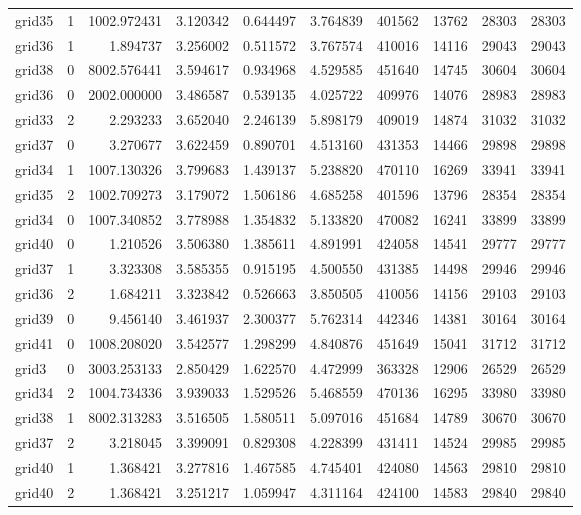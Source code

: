 \begin{longtable}{|l|r|r|r|r|r|r|r|r|r|}
grid35 & 1 & 1002.972431 & 3.120342 & 0.644497 & 3.764839 & 401562 & 13762 & 28303 & 28303 \\
grid36 & 1 & 1.894737 & 3.256002 & 0.511572 & 3.767574 & 410016 & 14116 & 29043 & 29043 \\
grid38 & 0 & 8002.576441 & 3.594617 & 0.934968 & 4.529585 & 451640 & 14745 & 30604 & 30604 \\
grid36 & 0 & 2002.000000 & 3.486587 & 0.539135 & 4.025722 & 409976 & 14076 & 28983 & 28983 \\
grid33 & 2 & 2.293233 & 3.652040 & 2.246139 & 5.898179 & 409019 & 14874 & 31032 & 31032 \\
grid37 & 0 & 3.270677 & 3.622459 & 0.890701 & 4.513160 & 431353 & 14466 & 29898 & 29898 \\
grid34 & 1 & 1007.130326 & 3.799683 & 1.439137 & 5.238820 & 470110 & 16269 & 33941 & 33941 \\
grid35 & 2 & 1002.709273 & 3.179072 & 1.506186 & 4.685258 & 401596 & 13796 & 28354 & 28354 \\
grid34 & 0 & 1007.340852 & 3.778988 & 1.354832 & 5.133820 & 470082 & 16241 & 33899 & 33899 \\
grid40 & 0 & 1.210526 & 3.506380 & 1.385611 & 4.891991 & 424058 & 14541 & 29777 & 29777 \\
grid37 & 1 & 3.323308 & 3.585355 & 0.915195 & 4.500550 & 431385 & 14498 & 29946 & 29946 \\
grid36 & 2 & 1.684211 & 3.323842 & 0.526663 & 3.850505 & 410056 & 14156 & 29103 & 29103 \\
grid39 & 0 & 9.456140 & 3.461937 & 2.300377 & 5.762314 & 442346 & 14381 & 30164 & 30164 \\
grid41 & 0 & 1008.208020 & 3.542577 & 1.298299 & 4.840876 & 451649 & 15041 & 31712 & 31712 \\
grid3 & 0 & 3003.253133 & 2.850429 & 1.622570 & 4.472999 & 363328 & 12906 & 26529 & 26529 \\
grid34 & 2 & 1004.734336 & 3.939033 & 1.529526 & 5.468559 & 470136 & 16295 & 33980 & 33980 \\
grid38 & 1 & 8002.313283 & 3.516505 & 1.580511 & 5.097016 & 451684 & 14789 & 30670 & 30670 \\
grid37 & 2 & 3.218045 & 3.399091 & 0.829308 & 4.228399 & 431411 & 14524 & 29985 & 29985 \\
grid40 & 1 & 1.368421 & 3.277816 & 1.467585 & 4.745401 & 424080 & 14563 & 29810 & 29810 \\
grid40 & 2 & 1.368421 & 3.251217 & 1.059947 & 4.311164 & 424100 & 14583 & 29840 & 29840 \\

\end{longtable}

